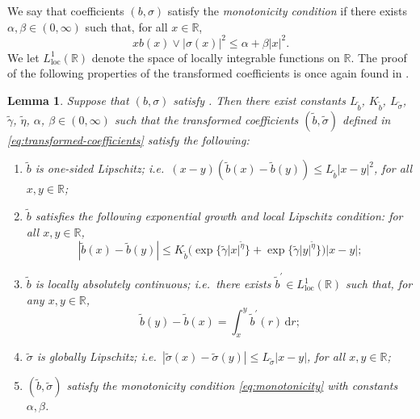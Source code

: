 \documentclass[onseside, final]{amsart}
\newtheorem{lemma}[theorem]{Lemma}
\theoremstyle{definition}
\newcommand{\R}{\mathbb R}
\newcommand{\loc}{\mathrm{loc}}
\newcommand{\D}{\,\mathrm{d}}
\numberwithin{equation}{section}
\begin{document}
		We say that coefficients $(b, \sigma)$ satisfy the \emph{monotonicity condition} if there exists $\alpha, \beta \in (0, \infty)$ such that, for all $x \in \R$,
		\begin{equation}\label{eq:monotonicity}
			xb(x) \vee |\sigma(x)|^2 \leq \alpha + \beta |x|^2.
		\end{equation}
		We let $L^1_\loc(\R)$ denote the space of locally integrable functions on $\R$.
		The proof of the following properties of the transformed coefficients is once again found in .
		
		\begin{lemma}\label{lem:transformed-coefficients}
			Suppose that $(b, \sigma)$ satisfy . Then there exist constants $L_{\tilde b}$, $K_{\tilde b}$, $L_{\tilde \sigma}$, $\tilde \gamma$, $\tilde \eta$, $\alpha$, $\beta \in (0,\infty)$ such that the transformed coefficients $(\tilde b, \tilde \sigma)$ defined in \eqref{eq:transformed-coefficients} satisfy the following:
			\begin{enumerate}[label = (\roman*)]
				\item $\tilde b$ is one-sided Lipschitz; i.e.~$(x - y)(\tilde b(x) - \tilde b(y)) \leq L_{\tilde b}|x - y|^2$, for all $x, y \in \R$;
				\item $\tilde b$ satisfies the following exponential growth and local Lipschitz condition: for all $x,y\in\R$,
				\begin{equation}\label{eq:exp-growth-transformed}
					|\tilde b(x)- \tilde b(y)|\le K_{\tilde b} \bigl(\exp\{\tilde \gamma |x|^{\tilde \eta}\} + \exp\bigl\{\tilde \gamma|y|^{\tilde \eta}\bigr\}\bigr) |x - y|; 
				\end{equation}
				\item $\tilde b$ is locally absolutely continuous; i.e.\ there exists $\tilde b^\prime \in L^1_\loc(\R)$ such that, for any $x, y \in \R$,
					\begin{equation}
						\tilde b(y) - \tilde b(x) = \int_x^y \tilde b^\prime(r) \D r;
					\end{equation}
				\item $\tilde \sigma$ is globally Lipschitz; i.e.~$|\tilde \sigma (x) - \tilde \sigma(y)| \leq L_{\tilde \sigma} |x - y|$, for all $x, y \in \R$;
				\item $(\tilde b, \tilde \sigma)$ satisfy the monotonicity condition \eqref{eq:monotonicity} with constants $\alpha, \beta$.
			\end{enumerate}
		\end{lemma}
		
\end{document}
